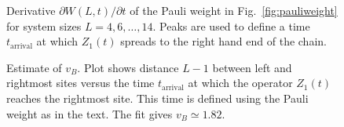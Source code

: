 \documentclass[aps,prx,twocolumn,superscriptaddress,floatfix,nofootinbib,prx]{revtex4}
\renewcommand{\>}{\right\rangle}
\newcommand{\<}{\left\langle}
\begin{document}
\begin{figure}[t]
\caption{
Derivative $\partial W(L,t)/\partial t$ of the Pauli weight in Fig.~\ref{fig:pauliweight} for system sizes $L=4,6, \ldots, 14$. Peaks are used to define a time $t_\text{arrival}$ at which $Z_1(t)$ spreads to the right hand end of the chain.
}
 \label{fig:pauliweightderivative}
\end{figure}

\begin{figure}[b]
\caption{
Estimate of $v_B$.
Plot shows distance $L-1$ between left and rightmost sites versus the time $t_\text{arrival}$ at which the operator $Z_1(t)$ reaches the rightmost site. This time is defined using the Pauli weight as in the text. The fit gives $v_B \simeq 1.82$.
}
 \label{fig:vBestimate}
\end{figure}
\end{document}
